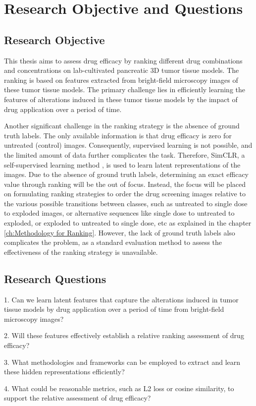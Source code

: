 \chapter{Research Objective and Questions}\label{ch:Research Objectives and Questions}
\section*{Research Objective}  
This thesis aims to assess drug efficacy by ranking different drug combinations and concentrations on lab-cultivated pancreatic 3D tumor tissue models.  
The ranking is based on features extracted from bright-field microscopy images of these tumor tissue models. The primary challenge lies in efficiently learning the features of alterations induced in these tumor tissue models by the impact of drug application over a period of time.  

Another significant challenge in the ranking strategy is the absence of ground truth labels. The only available information is that drug efficacy is zero for untreated (control) images. Consequently, supervised learning is not possible, and the limited amount of data further complicates the task. Therefore, SimCLR, a self-supervised learning method \cite{chen2020simple}, is used to learn latent representations of the images. Due to the absence of ground truth labels, determining an exact efficacy value through ranking will be the out of focus. Instead, the focus will be placed on formulating ranking strategies to order the drug screening images relative to the various possible transitions between classes, such as untreated to single dose to exploded images, or alternative sequences like single dose to untreated to exploded, or exploded to untreated to single dose, etc as explained in the chapter \ref{ch:Methodology for Ranking}. However, the lack of ground truth labels also complicates the problem, as a standard evaluation method to assess the effectiveness of the ranking strategy is unavailable.  
\section*{Research Questions}

1. Can we learn latent features that capture the alterations induced in tumor tissue models by drug application over a period of time from bright-field microscopy images?

2. Will these features effectively establish a relative ranking assessment of drug efficacy?

3. What methodologies and frameworks can be employed to extract and learn these hidden representations efficiently?

4. What could be reasonable metrics, such as L2 loss or cosine similarity, to support the relative assessment of drug efficacy?

